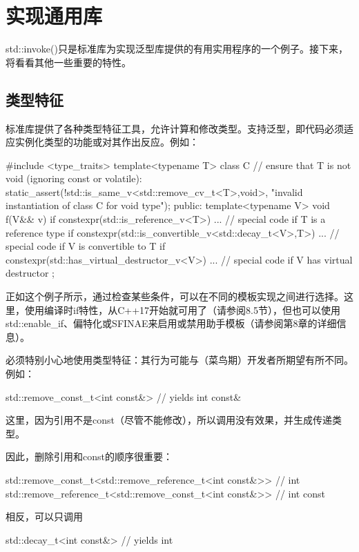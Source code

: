 \section{实现通用库}

std::invoke()只是标准库为实现泛型库提供的有用实用程序的一个例子。接下来，将看看其他一些重要的特性。

\subsection{类型特征}

标准库提供了各种类型特征工具，允许计算和修改类型。支持泛型，即代码必须适应实例化类型的功能或对其作出反应。例如：

\begin{cpp}
#include <type_traits>
template<typename T>
class C
{
	// ensure that T is not void (ignoring const or volatile):
	static_assert(!std::is_same_v<std::remove_cv_t<T>,void>,
					"invalid instantiation of class C for void type");
public:
	template<typename V>
	void f(V&& v) {
		if constexpr(std::is_reference_v<T>) {
			... // special code if T is a reference type
		}
		if constexpr(std::is_convertible_v<std::decay_t<V>,T>) {
			... // special code if V is convertible to T
		}
		if constexpr(std::has_virtual_destructor_v<V>) {
			... // special code if V has virtual destructor
		}
	}
};
\end{cpp}

正如这个例子所示，通过检查某些条件，可以在不同的模板实现之间进行选择。这里，使用编译时if特性，从C++17开始就可用了（请参阅8.5节），但也可以使用std::enable\_if、偏特化或SFINAE来启用或禁用助手模板（请参阅第8章的详细信息）。

必须特别小心地使用类型特征：其行为可能与（菜鸟期）开发者所期望有所不同。例如：

\begin{cpp}
std::remove_const_t<int const&> // yields int const&
\end{cpp}

这里，因为引用不是const（尽管不能修改），所以调用没有效果，并生成传递类型。

因此，删除引用和const的顺序很重要：

\begin{cpp}
std::remove_const_t<std::remove_reference_t<int const&>> // int
std::remove_reference_t<std::remove_const_t<int const&>> // int const
\end{cpp}

相反，可以只调用

\begin{cpp}
std::decay_t<int const&> // yields int
\end{cpp}

